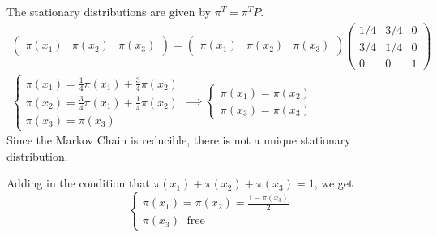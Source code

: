 \documentclass[12pt]{article}
\begin{document}
\begin{enumerate}[label=(\alph*)]
            \color{blue}
                The stationary distributions are given by $\pi^T = \pi^T P$.  
                \begin{gather*}
                    \begin{pmatrix}
                        \pi(x_1) &
                        \pi(x_2) &
                        \pi(x_3)
                    \end{pmatrix} = \begin{pmatrix}
                        \pi(x_1) &
                        \pi(x_2) &
                        \pi(x_3)
                    \end{pmatrix} \begin{pmatrix}
                        1/4 & 3/4 & 0\\
                        3/4 & 1/4 & 0\\
                        0 & 0 & 1
                    \end{pmatrix}\\
                    \begin{cases}
                        \pi(x_1) = \frac{1}{4}\pi(x_1) + \frac{3}{4}\pi(x_2)\\
                        \pi(x_2) = \frac{3}{4}\pi(x_1) + \frac{1}{4}\pi(x_2)\\
                        \pi(x_3) = \pi(x_3)
                    \end{cases} \implies \begin{cases}
                        \pi(x_1) = \pi(x_2)\\
                        \pi(x_3) = \pi(x_3)
                    \end{cases}
                \end{gather*}
                Since the Markov Chain is reducible, there is not a unique stationary distribution.
    
                Adding in the condition that $\pi(x_1) + \pi(x_2) + \pi(x_3) = 1$, we get 
                \[\boxed{\begin{cases}
                    \pi(x_1) = \pi(x_2) = \frac{1-\pi(x_3)}{2}\\
                    \pi(x_3) \; \text{ free}
                \end{cases}}\]
            
            \color{black}

    \end{enumerate} 
\end{document}
